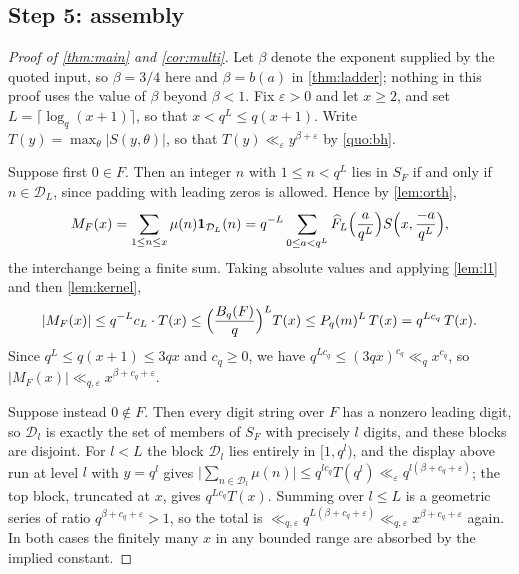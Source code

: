 \documentclass[11pt]{amsart}
\theoremstyle{definition}
\theoremstyle{remark}
\begin{document}
\subsection*{Step 5: assembly}

\begin{proof}[Proof of \cref{thm:main} and \cref{cor:multi}]
Let $\beta$ denote the exponent supplied by the quoted input, so $\beta = 3/4$ here and $\beta = b(a)$ in \cref{thm:ladder}; nothing in this proof uses the value of $\beta$ beyond $\beta < 1$. Fix $\varepsilon > 0$ and let $x \ge 2$, and set $L = \lceil \log_q(x+1) \rceil$, so that $x < q^L \le q(x+1)$. Write $T(y) = \max_\theta |S(y, \theta)|$, so that $T(y) \ll_\varepsilon y^{\beta + \varepsilon}$ by \cref{quo:bh}.

Suppose first $0 \in F$. Then an integer $n$ with $1 \le n < q^L$ lies in $S_F$ if and only if $n \in \mathcal D_L$, since padding with leading zeros is allowed. Hence by \cref{lem:orth},
\[
  M_F(x) = \sum_{1 \le n \le x} \mu(n) \mathbf 1_{\mathcal D_L}(n)
  = q^{-L} \sum_{0 \le a < q^L} \widehat F_L\Bigl(\frac{a}{q^L}\Bigr) S\Bigl(x, \frac{-a}{q^L}\Bigr) ,
\]
the interchange being a finite sum. Taking absolute values and applying \cref{lem:l1} and then \cref{lem:kernel},
\[
  |M_F(x)| \le q^{-L} c_L \cdot T(x) \le \Bigl(\frac{B_q(F)}{q}\Bigr)^L T(x) \le P_q(m)^L\, T(x) = q^{L c_q}\, T(x) .
\]
Since $q^L \le q(x+1) \le 3qx$ and $c_q \ge 0$, we have $q^{L c_q} \le (3qx)^{c_q} \ll_q x^{c_q}$, so $|M_F(x)| \ll_{q,\varepsilon} x^{\beta + c_q + \varepsilon}$.

Suppose instead $0 \notin F$. Then every digit string over $F$ has a nonzero leading digit, so $\mathcal D_l$ is exactly the set of members of $S_F$ with precisely $l$ digits, and these blocks are disjoint. For $l < L$ the block $\mathcal D_l$ lies entirely in $[1, q^l)$, and the display above run at level $l$ with $y = q^l$ gives $\bigl| \sum_{n \in \mathcal D_l} \mu(n) \bigr| \le q^{l c_q} T(q^l) \ll_\varepsilon q^{l(\beta + c_q + \varepsilon)}$; the top block, truncated at $x$, gives $q^{L c_q} T(x)$. Summing over $l \le L$ is a geometric series of ratio $q^{\beta + c_q + \varepsilon} > 1$, so the total is $\ll_{q,\varepsilon} q^{L(\beta + c_q + \varepsilon)} \ll_{q,\varepsilon} x^{\beta + c_q + \varepsilon}$ again. In both cases the finitely many $x$ in any bounded range are absorbed by the implied constant.


\end{proof}
\end{document}

